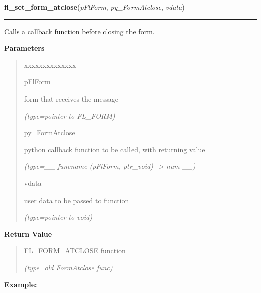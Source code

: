 \hspace{.8\funcindent}\begin{boxedminipage}{\funcwidth}

    \raggedright \textbf{fl\_set\_form\_atclose}(\textit{pFlForm}, \textit{py\_FormAtclose}, \textit{vdata})

    \vspace{-1.5ex}

    \rule{\textwidth}{0.5\fboxrule}
\setlength{\parskip}{2ex}
    Calls a callback function before closing the form.

\setlength{\parskip}{1ex}
      \textbf{Parameters}
      \vspace{-1ex}

      \begin{quote}
        \begin{Ventry}{xxxxxxxxxxxxxx}

          \item[pFlForm]

          form that receives the message

            {\it (type=pointer to FL\_FORM)}

          \item[py\_FormAtclose]

          python callback function to be called, with returning value

            {\it (type=\_\_ funcname (pFlForm, ptr\_void) -{\textgreater} num \_\_)}

          \item[vdata]

          user data to be passed to function

            {\it (type=pointer to void)}

        \end{Ventry}

      \end{quote}

      \textbf{Return Value}
    \vspace{-1ex}

      \begin{quote}
      FL\_FORM\_ATCLOSE function

      {\it (type=old FormAtclose func)}

      \end{quote}

\textbf{Example:}
\begin{quote}
  \begin{itemize}


\end{itemize}
\end{quote}
\end{boxedminipage}
